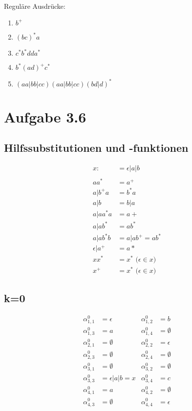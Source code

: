 \documentclass{article}
\begin{document}
Reguläre Ausdrücke:
\begin{enumerate}
	\item $b^+$
  \item $(bc)^*a$
  \item $c^*b^*dda^*$
  \item $b^*(ad)^+c^*$
  \item $(aa|bb|cc)(aa|bb|cc)(bd|d)^*$
\end{enumerate}



\section*{Aufgabe 3.6}
\subsection*{Hilfssubstitutionen und -funktionen}
\begin{align*}
x:&=\epsilon|a|b \\
&\\
aa^* &= a^+ \\
a|b^+a &= b^*a \\
a|b &= b|a \\
a|aa^*a &= a+ \\
a|ab^* &= ab^*\\
a|ab^*b &= a|ab^+ = ab^*\\
\epsilon|a^+ &= a*\\
xx^* &= x^* \mbox{ ($\epsilon \in x$)} \\
x^+ &= x^* \mbox{ ($\epsilon \in x$)}
\end{align*}


\subsection*{k=0}
\begin{align*}
\alpha^0_{1,1} &= \epsilon         & \alpha^0_{1,2} &= b \\
\alpha^0_{1,3} &= a                & \alpha^0_{1,4} &= \emptyset \\
\alpha^0_{2,1} &= \emptyset        & \alpha^0_{2,2} &= \epsilon \\
\alpha^0_{2,3} &= \emptyset        & \alpha^0_{2,4} &= \emptyset \\
\alpha^0_{3,1} &= \emptyset        & \alpha^0_{3,2} &= \emptyset \\
\alpha^0_{3,3} &= \epsilon|a|b = x & \alpha^0_{3,4} &= c \\
\alpha^0_{4,1} &= a                & \alpha^0_{4,2} &= \emptyset \\
\alpha^0_{4,3} &= \emptyset        & \alpha^0_{4,4} &= \epsilon
\end{align*}
\end{document}
